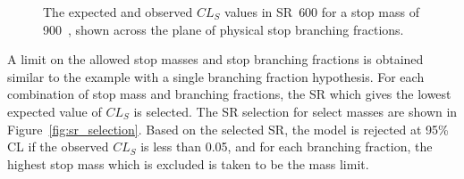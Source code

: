 \begin{figure}[p]
  \centering
  \caption{
    The expected and observed $CL_S$ values in SR~600 for a stop mass of
    900~\GeV, shown across the plane of physical stop branching fractions.
  }
  \label{fig:cls_plane_sr_600_m_900}
\end{figure}

A limit on the allowed stop masses and stop branching fractions is obtained
similar to the example with a single branching fraction hypothesis.
For each combination of stop mass and branching fractions, the SR which gives
the lowest expected value of $CL_S$ is selected. The SR selection for select
masses are shown in Figure~\ref{fig:sr_selection}.
Based on the selected SR, the model is rejected at 95\% CL if the observed
$CL_S$ is less than 0.05, and for each branching fraction, the highest stop
mass which is excluded is taken to be the mass limit.

